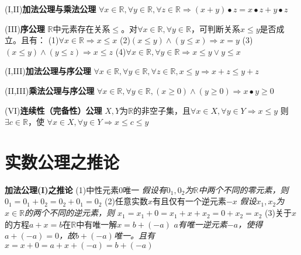 \documentclass[11pt]{article}
\begin{document}
(I,II)\textbf{加法公理与乘法公理}
\newline
$\forall x \in \mathbb{R}, \forall y \in \mathbb{R}, \forall z \in\mathbb{R} \Rightarrow (x+y) \bullet z=x \bullet z+y \bullet z$
\newline

(III)\textbf{序公理}
\newline
$\mathbb{R}$中元素存在关系$\le$。对$\forall x \in \mathbb{R}, \forall y \in \mathbb{R}$，可判断关系$x \le y$是否成立。且有：
\newline
(1)$\forall x \in \mathbb{R} \Rightarrow x \le x$
\newline
(2)$(x \le y) \land (y \le x) \Rightarrow x=y$
\newline
(3)$(x \le y) \land (y \le z) \Rightarrow x \le z$
\newline
(4)$\forall x \in \mathbb{R}, \forall y \in \mathbb{R} \Rightarrow x \le y \lor y \le x$
\newline

(I,III)\textbf{加法公理与序公理}
\newline
$\forall x \in \mathbb{R}, \forall y \in \mathbb{R}, \forall z \in \mathbb{R}, x \le y \Rightarrow x+z \le y+z$
\newline

(II,III)\textbf{乘法公理与序公理}
\newline
$\forall x \in \mathbb{R}, \forall y \in \mathbb{R}, (x \ge 0) \land (y \ge 0) \Rightarrow x \bullet y \ge 0$
\newline

(VI)\textbf{连续性（完备性）公理}
\newline
$X, Y$为$\mathbb{R}$的非空子集，且$\forall x \in X, \forall y \in Y \Rightarrow x \le y$
则$\exists c \in \mathbb{R}$，使
\newline
$\forall x \in X, \forall y \in Y \Rightarrow x \le c \le y$
\newline

\section{实数公理之推论}
\textbf{加法公理(I)之推论}
\newline
(1)中性元素$0$唯一
\newline
\textit{假设有$0_1, 0_2$为$\mathbb{R}$中两个不同的零元素，则
$0_1=0_1+0_2=0_2+0_1=0_2$}
\newline
(2)任意实数$x$有且仅有一个逆元素$-x$
\newline
\textit{假设$x_1, x_2$为$x \in \mathbb{R}$的两个不同的逆元素，则
$x_1=x_1+0=x_1+x+x_2=0+x_2=x_2$}
\newline
(3)关于$x$的方程$a+x=b$在$\mathbb{R}$中有唯一解$x=b+(-a)$
\newline
\textit{$a$有唯一逆元素$-a$，使得$a+(-a)=0$，故$b+(-a)$唯一。且有
$x=x+0=a+x+(-a)=b+(-a)$}
\newline
\end{document}
